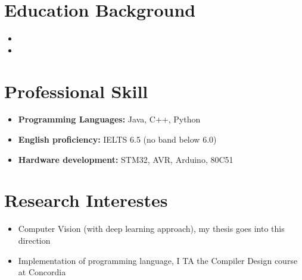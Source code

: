 \documentclass[11pt,a4paper,sans]{moderncv}
\begin{document}
\makecvtitle


\section{Education Background}
\vspace{2pt}
\begin{itemize}
\item{}
\item{}
\end{itemize}

\section{Professional Skill}

\begin{itemize}
\item \textbf{Programming Languages: } Java, C++, Python

\item \textbf{English proficiency: } IELTS 6.5 (no band below 6.0)

\item \textbf{Hardware development:} STM32, AVR, Arduino, 80C51
\end{itemize}

\section{Research Interestes}

\begin{itemize}
\item Computer Vision (with deep learning approach), my thesis goes into this direction
\item Implementation of programming language, I TA the Compiler Design course at Concordia
\end{itemize}
\end{document}
